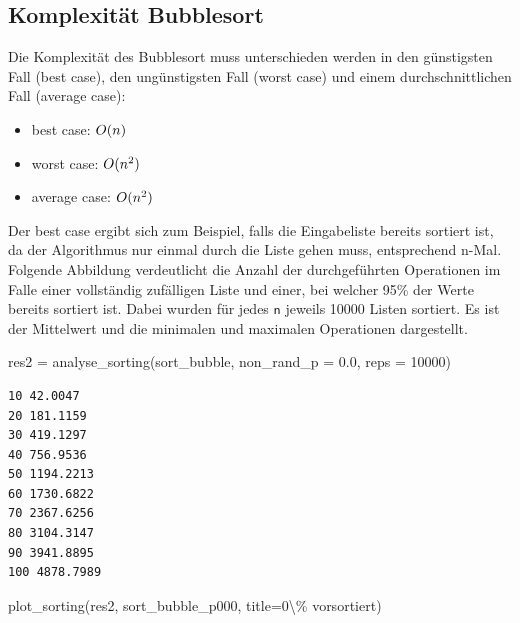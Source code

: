 \documentclass[
  letterpaper,
  DIV=11,
  numbers=noendperiod]{scrreprt}
\newenvironment{Shaded}{\begin{snugshade}}{\end{snugshade}}
\newcommand{\DecValTok}[1]{\textcolor[rgb]{0.68,0.00,0.00}{#1}}
\newcommand{\FloatTok}[1]{\textcolor[rgb]{0.68,0.00,0.00}{#1}}
\newcommand{\NormalTok}[1]{\textcolor[rgb]{0.00,0.23,0.31}{#1}}
\newcommand{\OperatorTok}[1]{\textcolor[rgb]{0.37,0.37,0.37}{#1}}
\newcommand{\StringTok}[1]{\textcolor[rgb]{0.13,0.47,0.30}{#1}}
\providecommand{\tightlist}{%
  \setlength{\itemsep}{0pt}\setlength{\parskip}{0pt}}\usepackage{longtable,booktabs,array}
\begin{document}
\subsection{Komplexität Bubblesort}\label{komplexituxe4t-bubblesort}

Die Komplexität des Bubblesort muss unterschieden werden in den
günstigsten Fall (best case), den ungünstigsten Fall (worst case) und
einem durchschnittlichen Fall (average case):

\begin{itemize}
\tightlist
\item
  best case: \(\mathsf \mathcal{O} (n)\)
\item
  worst case: \(\mathsf \mathcal{O} (n^2)\)
\item
  average case: \(\mathsf \mathcal{O} (n^2)\)
\end{itemize}

Der best case ergibt sich zum Beispiel, falls die Eingabeliste bereits
sortiert ist, da der Algorithmus nur einmal durch die Liste gehen muss,
entsprechend n-Mal. Folgende Abbildung verdeutlicht die Anzahl der
durchgeführten Operationen im Falle einer vollständig zufälligen Liste
und einer, bei welcher 95\% der Werte bereits sortiert ist. Dabei wurden
für jedes \(\mathsf n\) jeweils 10000 Listen sortiert. Es ist der
Mittelwert und die minimalen und maximalen Operationen dargestellt.

\begin{Shaded}
\begin{Highlighting}[]
\NormalTok{res2 }\OperatorTok{=}\NormalTok{ analyse\_sorting(sort\_bubble, non\_rand\_p }\OperatorTok{=} \FloatTok{0.0}\NormalTok{, reps }\OperatorTok{=} \DecValTok{10000}\NormalTok{)}
\end{Highlighting}
\end{Shaded}

\begin{verbatim}
10 42.0047
20 181.1159
30 419.1297
40 756.9536
50 1194.2213
60 1730.6822
70 2367.6256
80 3104.3147
90 3941.8895
100 4878.7989
\end{verbatim}

\begin{Shaded}
\begin{Highlighting}[]
\NormalTok{plot\_sorting(res2, }\StringTok{\textquotesingle{}sort\_bubble\_p000\textquotesingle{}}\NormalTok{, title}\OperatorTok{=}\StringTok{\textquotesingle{}0\textbackslash{}\% vorsortiert\textquotesingle{}}\NormalTok{)}
\end{Highlighting}
\end{Shaded}
\end{document}
